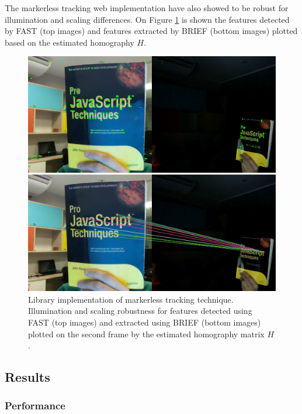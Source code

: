 The markerless tracking web implementation have also showed to be robust for illumination and scaling differences. On Figure \ref{figure:keypoints_fast_brief} is shown the features detected by FAST (top images) and features extracted by BRIEF (bottom images) plotted based on the estimated homography $H$.

\begin{figure}[!htb]
  \centering
  \includegraphics[width=\linewidth]{chapters/evaluation/keypoints_fast_brief.png}
  \caption{Library implementation of markerless tracking technique. Illumination and scaling robustness for features detected using FAST (top images) and extracted using BRIEF (bottom images) plotted on the second frame by the estimated homography matrix $H$.}
  \label{figure:keypoints_fast_brief}
\end{figure}


\subsection{Results} %
\label{sub:evaluation:markerless_tracking_algorithm:results}

\subsubsection{Performance} %
\label{subsub:evaluation:markerless_tracking_algorithm:results:performance}


